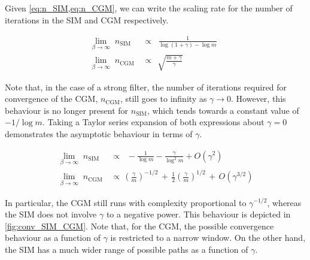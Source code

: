 Given \cref{eq:n_SIM,eq:n_CGM}, we can write the scaling rate for the number of iterations in the SIM and CGM respectively. 

\begin{align}
    \lim_{\beta \rightarrow \infty} \;  n_{\text{SIM}} \, & \propto \;\;  \frac{1}{\log(1 + \gamma) - \log m} \;\; \\[0.5cm]
    \lim_{\beta \rightarrow \infty} \;  n_{\text{CGM}} \, & \propto \;\, \sqrt{\frac{m + \gamma}{\gamma}}
\end{align}
 

Note that, in the case of a strong filter, the number of iterations required for convergence of the CGM, $n_\text{CGM}$, still goes to infinity as $\gamma \rightarrow 0$. However, this behaviour is no longer present for $n_\text{SIM}$, which tends towards a constant value of $-1/\log m$. Taking a Taylor series expansion of both expressions about $\gamma=0$ demonstrates the asymptotic behaviour in terms of $\gamma$. 


\begin{align}
    \lim_{\beta \rightarrow \infty} \;  n_{\text{SIM}} \, & \propto \;\;  -\frac{1}{\log m} - \frac{\gamma}{\log^2 m} + O\left(\gamma^2\right) \\[0.5cm]
    \lim_{\beta \rightarrow \infty} \;  n_{\text{CGM}} \, & \propto \, \left(\frac{\gamma}{m} \right)^{-1/2} \, + \, \frac{1}{2}\left(\frac{\gamma}{m}\right)^{1/2} \, + \, O\left(\gamma^{3/2}\right) 
\end{align}

In particular, the CGM still runs with complexity proportional to $\gamma^{-1/2}$, whereas the SIM does not involve $\gamma$ to a negative power. This behaviour is depicted in \cref{fig:conv_SIM_CGM}. Note that, for the CGM, the possible convergence behaviour as a function of $\gamma$ is restricted to a narrow window. On the other hand, the SIM has a much wider range of possible paths as a function of $\gamma$. 


